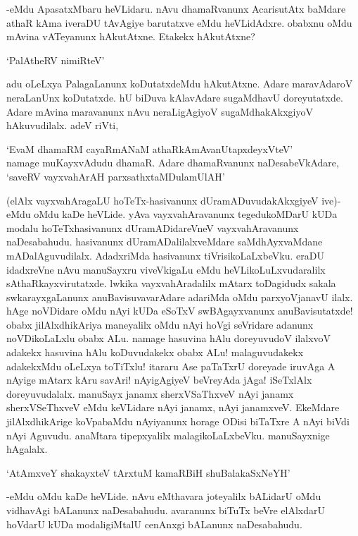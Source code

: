 -eMdu ApasatxMbaru heVLidaru. nAvu dhamaRvanunx AcarisutAtx baMdare athaR kAma iveraDU tAvAgiye barutatxve eMdu heVLidAdxre. obabxnu oMdu mAvina vATeyanunx hAkutAtxne. Etakekx hAkutAtxne?

\begin{shloka}
`PalAtheRV nimiRteV'
\end{shloka}

adu oLeLxya PalagaLanunx koDutatxdeMdu hAkutAtxne. Adare maravAdaroV neraLanUnx koDutatxde. hU biDuva kAlavAdare sugaMdhavU doreyutatxde. Adare mAvina maravanunx nAvu neraLigAgiyoV sugaMdhakAkxgiyoV hAkuvudilalx. adeV riVti,

\begin{shloka}
`EvaM dhamaRM cayaRmANaM athaRkAmAvanUtapxdeyxVteV'\\
namage muKayxvAdudu dhamaR. Adare dhamaRvanunx naDesabeVkAdare,\\
`saveRV vayxvahArAH parxsathxtaMDulamUlAH'
\end{shloka}

(elAlx vayxvahAragaLU hoTeTx-hasivanunx dUramADuvudakAkxgiyeV ive)- eMdu oMdu kaDe heVLide. yAva vayxvahAravanunx tegedukoMDarU kUDa modalu hoTeTxhasivanunx dUramADidareVneV vayxvahAravanunx naDesabahudu. hasivanunx dUramADalilalxveMdare saMdhAyxvaMdane mADalAguvudilalx. AdadxriMda hasivanunx tiVrisikoLaLxbeVku. eraDU idadxreVne nAvu manuSayxru viveVkigaLu eMdu heVLikoLuLxvudaralilx sAthaRkayxvirutatxde. lwkika vayxvahAradalilx mAtarx toDagidudx sakala swkarayxgaLanunx anuBavisuvavarAdare adariMda oMdu parxyoVjanavU ilalx. hAge noVDidare oMdu nAyi kUDa eSoTxV swBAgayxvanunx anuBavisutatxde! obabx jilAlxdhikAriya maneyalilx oMdu nAyi hoVgi seVridare adanunx noVDikoLaLxlu obabx ALu. namage hasuvina hAlu doreyuvudoV ilalxvoV adakekx hasuvina hAlu koDuvudakekx obabx ALu! malaguvudakekx adakekxMdu oLeLxya toTiTxlu! itararu Ase paTaTxrU doreyade iruvAga A nAyige mAtarx kAru savAri! nAyigAgiyeV beVreyAda jAga! iSeTxlAlx doreyuvudalalx. manuSayx janamx sherxVSaThxveV nAyi janamx sherxVSeThxveV eMdu keVLidare nAyi janamx, nAyi janamxveV. EkeMdare jilAlxdhikArige koVpabaMdu nAyiyanunx horage ODisi biTaTxre A nAyi biVdi nAyi Aguvudu. anaMtara tipepxyalilx malagikoLaLxbeVku. manuSayxnige hAgalalx.

\begin{shloka}
`AtAmxveY shakayxteV tArxtuM kamaRBiH shuBalakaSxNeYH'
\end{shloka}

-eMdu oMdu kaDe heVLide. nAvu eMthavara joteyalilx bALidarU oMdu vidhavAgi bALanunx naDesabahudu. avaranunx biTuTx beVre elAlxdarU hoVdarU kUDa modaligiMtalU cenAnxgi bALanunx naDesabahudu.

